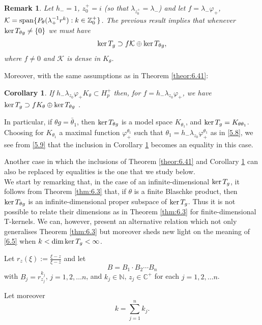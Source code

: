 \documentclass[11pt]{article}
\def\CC{\mathbb{C}}
\def\NN{\mathbb{N}}
\def\ZZ{\mathbb{Z}}
\def\dim{\mathop{\rm dim}\nolimits}
\def\ker{\mathop{\rm ker}\nolimits}
\renewcommand\span{\mathop{\rm span}\nolimits}
\def\spam{\span} %
\renewcommand\phi{\varphi}
\newtheorem{cor}[thm]{Corollary}
\newtheorem{rem}[thm]{Remark}
\numberwithin{equation}{section}
\def\beq{\begin{equation}}
\def\eeq{\end{equation}}
\begin{document}
\begin{rem}
Let $h_-=1$, $z_0^+=i$ (so that $\lambda_{z_0^+}=\lambda_-$) and let $f=\lambda_-\phi_+$, $\mathcal{K}=\spam \{P_\theta(\lambda_+^{-1}r^k): k \in \ZZ_0^+\}$. The previous result implies that whenever $\ker T_{\theta g}\neq \{0\}$ we must have
\beq\label{6.9}
\ker T_g \supset f \mathcal{K} \oplus \ker T_{\theta g},
\eeq
where $f\neq 0$ and $\mathcal{K}$ is dense in $K_\theta$.
\end{rem}

Moreover, with the same assumptions as in Theorem \ref {theor:6.41}:

\begin{cor} \label{cor:6.6}
If $h_-\lambda_{z_0}\phi_+K_\theta \subset H_p^+$ then, for  $f=h_-\lambda_{z_0}\phi_+$, we have $\ker T_g \supset f K_\theta \oplus \ker T_{\theta g}$ .
\end{cor}

In particular, if $\theta g=\bar \theta_1$, then $\ker T_{\theta g}$ is a model space $K_{\theta_1}$, and $\ker T_g =K_{\theta \theta_1}$. Choosing for $K_{\theta_1}$ a maximal function $\phi_+^{\theta_1}$ such that $\theta_1=h_-\lambda_{z_0} \phi_+^{\theta_1}$ as in \eqref{5.8}, we see from \eqref{5.9} that the inclusion in Corollary \ref {cor:6.6} becomes an equality in this case.

Another case in which the inclusions of Theorem \ref{theor:6.41} and Corollary \ref{cor:6.6} can also be replaced by equalities is the one that we study below.
\\


We start by remarking that, in the case of an infinite-dimensional $\ker T_g$, it follows from Theorem \ref{thm:6.3} that, if $\theta$ is a finite Blaschke product, then $\ker T_{\theta g}$ is an infinite-dimensional proper subspace of $\ker T_g$. Thus it is not possible to relate their dimensions as in Theorem \ref{thm:6.3} for finite-dimensional T-kernels. We can, however, present an alternative relation which not only generalises Theorem \ref{thm:6.3} but moreover sheds new light on the meaning of \eqref{6.5} when $k < \dim \ker T_g < \infty$.

\vspace{0,2cm}

Let $r_z(\xi):=\frac{\xi-z}{\xi-\bar{z}}$ and let
\[B=B_1\cdot B_2  \cdots B_n\]
with $B_j=r_{z_j}^{k_j}$, $j=1,2,\hdots n$, and $k_j \in \NN$, $z_j \in \CC^+$ for each $j=1,2,\hdots n$.

Let moreover
\[k=\sum_{j=1}^{n}k_j.\]
\end{document}
